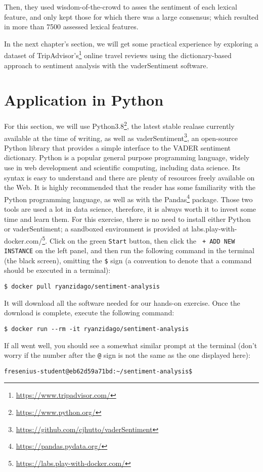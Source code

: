 	Then, they used wisdom-of-the-crowd to asses the sentiment of each lexical feature, and only kept those for which there was a large consensus; which resulted in more than 7500 assessed lexical features.
	
	In the next chapter's section, we will get some practical experience by exploring a dataset of TripAdvisor's\footnote{\href{https://www.tripadvisor.com/}{https://www.tripadvisor.com/}} online travel reviews using the dictionary-based approach to sentiment analysis with the vaderSentiment software.
	\section{Application in Python}\label{sec:applicationsinR}
	For this section, we will use Python3.8\footnote{\href{https://www.python.org/}{https://www.python.org/}}, the latest stable realase currently available at the time of writing, as well as vaderSentiment\footnote{\href{https://github.com/cjhutto/vaderSentiment}{https://github.com/cjhutto/vaderSentiment}}, an open-source Python library that provides a simple interface to the VADER sentiment dictionary. Python is a popular general purpose programming language, widely use in web development and scientific computing, including data science. Its syntax is easy to understand and there are plenty of resources freely available on the Web. It is highly recommended that the reader has some familiarity with the Python programming language, as well as with the Pandas\footnote{\href{https://pandas.pydata.org/}{https://pandas.pydata.org/}} package. Those two tools are used a lot in data science, therefore, it is always worth it to invest some time and learn them. For this exercise, there is no need to install either Python or vaderSentiment; a sandboxed environment is provided at labs.play-with-docker.com/\footnote{\href{https://labs.play-with-docker.com/}{https://labs.play-with-docker.com/}}. Click on the green \verb#Start# button, then click the \verb# + ADD NEW INSTANCE# on the left panel, and then run the following command in the terminal (the black screen), omitting the \verb#$# sign (a convention to denote that a command should be executed in a terminal): 
	\begin{Verbatim}
$ docker pull ryanzidago/sentiment-analysis
	\end{Verbatim}
	It will download all the software needed for our hands-on exercise. Once the download is complete, execute the following command:
	\begin{Verbatim}
$ docker run --rm -it ryanzidago/sentiment-analysis
	\end{Verbatim}
	If all went well, you should see a somewhat similar prompt at the terminal (don't worry if the number after the \verb#@# sign is not the same as the one displayed here):
	\begin{Verbatim}
fresenius-student@eb62d59a71bd:~/sentiment-analysis$
	\end{Verbatim}
	
